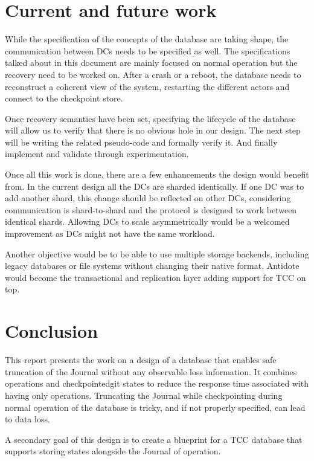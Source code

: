 \documentclass[11pt]{article}
\newcommand{\commentaire}[2][fromWhom?]{{
  \color{magenta}{\bfseries\sffamily\scriptsize$\triangleright$(#1:) #2$\triangleleft$}
}}
\begin{document}
\section{Current and future work}
\label{sec:current-future}

While the specification of the concepts of the database are taking shape, the
communication between DCs needs to be specified as well.
The specifications talked about in this document are mainly focused on normal
operation but the recovery need to be worked on. 
After a crash or a reboot, the database needs to reconstruct a coherent view of
the system, restarting the different actors and connect to the checkpoint store.

Once recovery semantics have been set, specifying the lifecycle of the
database will allow us to verify that there is no obvious hole in our design.
The next step will be writing the related pseudo-code and formally verify
it. 
And finally implement and validate through experimentation.

Once all this work is done, there are a few enhancements the design would benefit
from.
In the current design all the DCs are sharded identically. 
If one DC was to add another shard, this change should be reflected on other DCs,
considering communication is shard-to-shard and the protocol is designed to
work between identical shards.
Allowing DCs to scale asymmetrically would be a welcomed improvement as DCs
might not have the same workload.

Another objective would be to be able to use multiple storage backends,
including legacy databases or file systems without changing their
native format. 
Antidote would become the transactional and replication layer adding support
for TCC on top.




\section{Conclusion}
\label{sec:conclusion}

This report presents the work on a design of a database that enables safe 
truncation of the Journal without any observable loss information. 
It combines operations and checkpointedgit states to reduce the response time
associated with having only operations.
Truncating the Journal while checkpointing during normal operation of the
database is tricky, and if not properly specified, can lead to data loss.

A secondary goal of this design is to create a blueprint for a TCC database that
supports storing states alongside the Journal of operation.




\end{document}
